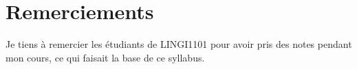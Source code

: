 \section*{Remerciements}

Je tiens à remercier les étudiants de LINGI1101 pour avoir pris des notes pendant mon cours, ce qui faisait la base de ce syllabus.
